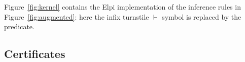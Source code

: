Figure~\ref{fig:kernel} contains the Elpi implementation of the
inference rules in Figure~\ref{fig:augmented}: here the infix
turnstile $\vdash$ symbol is replaced by the  predicate.
%

\subsection{Certificates}

